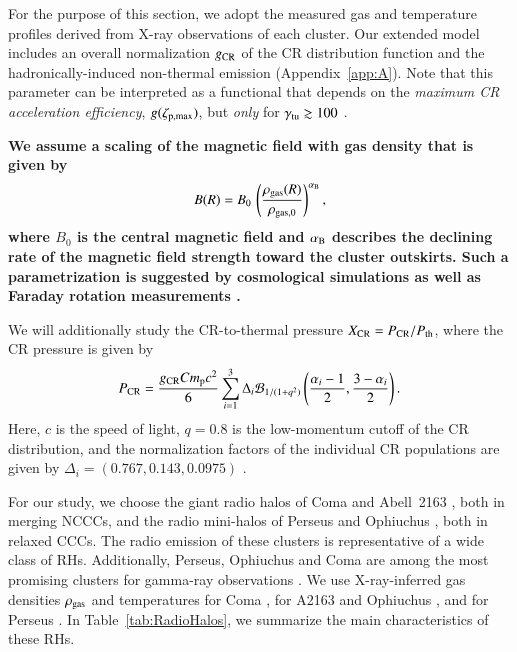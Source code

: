\documentclass[useAMS,usenatbib]{mn2e}
\begin{document}
For the purpose of this section, we adopt the
measured gas and temperature profiles derived from X-ray observations of each cluster.  
Our extended model includes an overall normalization $g_{{\mathrm{CR}}}$ of the CR
distribution function and the hadronically-induced non-thermal emission 
(Appendix~\ref{app:A}). Note that
this parameter can be interpreted as a functional that depends on the
\emph{maximum CR acceleration efficiency}, $g(\zeta_{{\mathrm{p,max}}})$,
but \emph{only} for $\gamma_{{\mathrm{tu}}}\gtrsim100$ \citep{2010MNRAS.409..449P}. 

{\bf We assume a scaling of the magnetic field with gas density that is given by
\begin{equation}
B(R) = B_0\,\left(\frac{\rho_{{\mathrm{gas}}}(R)}{\rho_{{\mathrm{gas}},0}}\right)^{ \alpha_{{\mathrm{B}}}},
\label{eq:B}
\end{equation}
where $B_0$ is the central magnetic field and $\alpha_{{\mathrm{B}}}$ describes the
declining rate of the magnetic field strength toward the cluster outskirts. Such
a parametrization is suggested by cosmological simulations \citep{2008A&A...482L..13D} 
as well as Faraday rotation measurements 
\citep[][and references therein]{2010A&A...513A..30B, 2011A&A...529A..13K}.}

We will additionally study the CR-to-thermal
pressure $X_{{\mathrm{CR}}}=P_{{\mathrm{CR}}}/P_{{\mathrm{th}}}$, where the CR pressure is
given by
\begin{equation}
  \label{eq:PCR}
  P_{{\mathrm{CR}}}=\frac{g_{{\mathrm{CR}}} C m_{{\mathrm{p}}} c^{2}}{6}
  \sum_{i=1}^{3} \Delta_{i} \mathcal{B}_{1/(1+q^2)} \left(
    \frac{\alpha_{i}-1}{2},\frac{3-\alpha_{i}}{2} \right).
\end{equation}
Here, $c$ is the speed of light, $q=0.8$ is the low-momentum cutoff of the CR
distribution, and the normalization factors of the individual CR populations are
given by $\Delta_{i} = (0.767, 0.143, 0.0975)$ \citep[][see also
Appendix~\ref{app:A}]{2010MNRAS.409..449P}.

For our study, we choose the giant radio halos of Coma
\citep{1997A&A...321...55D} and Abell~2163 \citep{2001A&A...373..106F,
  2009A&A...499..679M}, both in merging NCCCs, and the radio mini-halos of
Perseus \citep{1990MNRAS.246..477P} and Ophiuchus \citep{2009A&A...499..371G,
  2009A&A...499..679M}, both in relaxed CCCs. The radio emission of these
clusters is representative of a wide class of RHs.  Additionally, Perseus,
Ophiuchus and Coma are among the most promising clusters for gamma-ray
observations \citep{2010MNRAS.409..449P,2011arXiv1105.3240P}. 
We use X-ray-inferred gas densities $\rho_{{\mathrm{gas}}}$ and temperatures 
for Coma \citep{1992A&A...259L..31B}, for A2163 and Ophiuchus 
\citep{2002ApJ...567..716R}, and for Perseus \citep{2003ApJ...590..225C}. 
In Table~\ref{tab:RadioHalos}, we summarize the main characteristics of these RHs.
 
\end{document}
